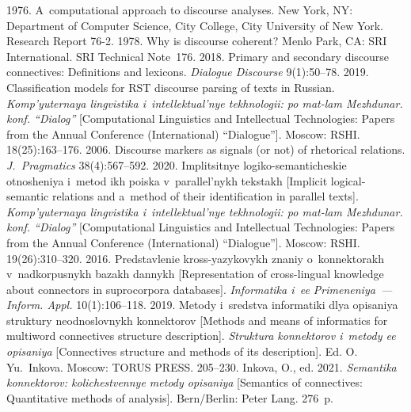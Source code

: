 \begin{multicols}{2}
{{\begin{thebibliography}{99}
 1976. A~computational approach to discourse analyses.  New York, NY: Department of Computer Science, City College, City University of New 
York.  Research Report  
76-2.
 1978. Why is discourse coherent?  Menlo Park, 
CA: SRI International. SRI Technical Note~176.
 2018. Primary and secondary discourse connectives: Definitions and lexicons. 
\textit{Dialogue Discourse} 9(1):50--78.
 2019. Classification models for RST discourse parsing of 
texts in Russian. \textit{Komp'yuternaya lingvistika i~intellektual'nye tekhnologii: po mat-lam 
Mezhdunar. konf. ``Dialog''} [Computational Linguistics and Intellectual Technologies: Papers 
from the Annual Conference (International) ``Dialogue'']. Moscow: RSHI. 18(25):163--176.
 2006. Discourse markers as signals (or not) of rhetorical relations. 
\textit{J.~Pragmatics} 38(4):567--592.
 2020. Implitsitnye logiko-semanticheskie 
otnosheniya i~metod ikh poiska v~parallel'nykh tekstakh [Implicit logical-semantic relations and 
a~method of their identification in parallel texts]. \textit{Komp'yuternaya lingvistika 
i~intellektual'nye tekhnologii: po mat-lam Mezhdunar. konf. ``Dialog''} [Computational 
Linguistics and Intellectual Technologies: Papers from the Annual Conference (International) 
``Dialogue'']. Moscow: RSHI. 19(26):310--320.
 2016. 
Predstavlenie kross-yazykovykh znaniy o~konnektorakh v~nadkorpusnykh bazakh dannykh 
[Representation of cross-lingual knowledge about connectors in suprocorpora databases]. 
\textit{Informatika i~ee Primeneniya~--- Inform. Appl.} 10(1):106--118.
 2019. Metody i~sredstva informatiki 
dlya opisaniya struktury neodnoslovnykh konnektorov [Methods and means of informatics for 
multiword connectives structure description]. \textit{Struktura konnektorov i~metody ee 
opisaniya} [Connectives structure and methods of its description]. Ed. O.\,Yu.~Inkova. Moscow: 
TORUS PRESS. 205--230.
Inkova, O., ed. 2021. \textit{Semantika konnektorov: kolichestvennye metody opisaniya} 
[Semantics of connectives: Quantitative methods of analysis]. Bern/Berlin: Peter Lang. 276~p.

\end{thebibliography}}}
\end{multicols}
